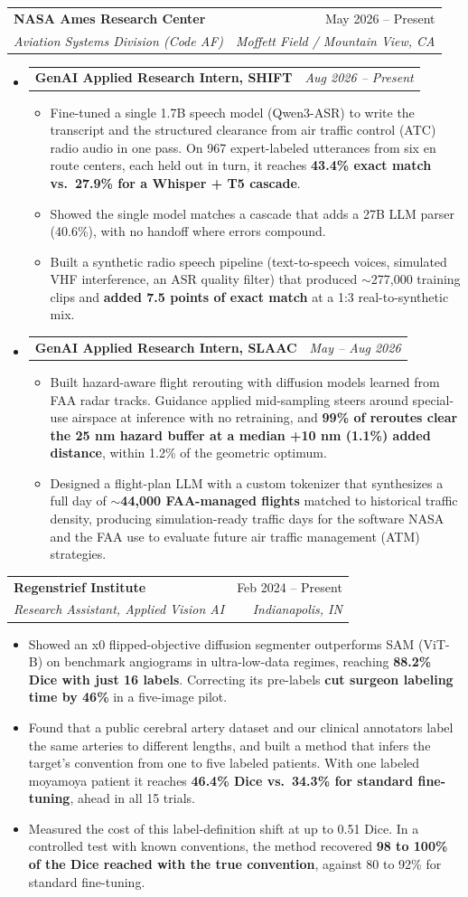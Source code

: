 \documentclass[letterpaper,10pt]{article}
\makeatletter
\newcommand{\resumeItem}[1]{
  \item\small{
    {#1 \vspace{-2pt}}
  }
}
\newcommand{\resumeSubheading}[4]{
  \vspace{1pt}\item
    \begin{tabular*}{0.97\textwidth}[t]{l@{\extracolsep{\fill}}r}
      \textbf{#1} & #2 \\
      \textit{\small#3} & \textit{\small #4} \\
    \end{tabular*}\vspace{-7pt}
}
\newcommand{\resumeSubSubheading}[2]{
    \vspace{4pt}\item
    \begin{tabular*}{\dimexpr0.97\textwidth-0.15in\relax}{l@{\extracolsep{\fill}}r}
      \textbf{\small#1} & \textit{\small #2} \\
    \end{tabular*}\vspace{-2pt}
}
\newcommand{\resumeSubHeadingListEnd}{\end{itemize}}
\newcommand{\resumeSubRoleListStart}{\begin{itemize}[leftmargin=0.15in, label={}, topsep=0pt, partopsep=0pt, itemsep=0pt, parsep=0pt]}
\newcommand{\resumeItemListStart}{\begin{itemize}[label=\textbullet, itemsep=3pt, parsep=0pt, topsep=4pt plus 0pt minus 0pt]}
\newcommand{\resumeItemListEnd}{\end{itemize}\vspace{-2pt}}
\makeatother
\begin{document}
    \resumeSubheading
      {NASA Ames Research Center}{May 2026 -- Present}
      {Aviation Systems Division (Code AF)}{Moffett Field / Mountain View, CA}
      \resumeSubRoleListStart
        \resumeSubSubheading{GenAI Applied Research Intern, SHIFT}{Aug 2026 -- Present}
        \resumeItemListStart
        \resumeItem{Fine-tuned a single 1.7B speech model (Qwen3-ASR) to write the transcript and the structured clearance from air traffic control (ATC) radio audio in one pass. On 967 expert-labeled utterances from six en route centers, each held out in turn, it reaches \textbf{43.4\% exact match vs.\ 27.9\% for a Whisper + T5 cascade}.}
        \resumeItem{Showed the single model matches a cascade that adds a 27B LLM parser (40.6\%), with no handoff where errors compound.}
        \resumeItem{Built a synthetic radio speech pipeline (text-to-speech voices, simulated VHF interference, an ASR quality filter) that produced $\sim$277,000 training clips and \textbf{added 7.5 points of exact match} at a 1:3 real-to-synthetic mix.}
        \resumeItemListEnd
        \vspace{4pt}
        \resumeSubSubheading{GenAI Applied Research Intern, SLAAC}{May -- Aug 2026}
        \resumeItemListStart
        \resumeItem{Built hazard-aware flight rerouting with diffusion models learned from FAA radar tracks. Guidance applied mid-sampling steers around special-use airspace at inference with no retraining, and \textbf{99\% of reroutes clear the 25 nm hazard buffer at a median +10 nm (1.1\%) added distance}, within 1.2\% of the geometric optimum.}
        \resumeItem{Designed a flight-plan LLM with a custom tokenizer that synthesizes a full day of \textbf{$\sim$44,000 FAA-managed flights} matched to historical traffic density, producing simulation-ready traffic days for the software NASA and the FAA use to evaluate future air traffic management (ATM) strategies.}
        \resumeItemListEnd
      \resumeSubHeadingListEnd

    \resumeSubheading
      {Regenstrief Institute}{Feb 2024 -- Present}
      {Research Assistant, Applied Vision AI}{Indianapolis, IN}
      \resumeItemListStart
        \resumeItem{Showed an x0 flipped-objective diffusion segmenter outperforms SAM (ViT-B) on benchmark angiograms in ultra-low-data regimes, reaching \textbf{88.2\% Dice with just 16 labels}. Correcting its pre-labels \textbf{cut surgeon labeling time by 46\%} in a five-image pilot.}
        \resumeItem{Found that a public cerebral artery dataset and our clinical annotators label the same arteries to different lengths, and built a method that infers the target's convention from one to five labeled patients. With one labeled moyamoya patient it reaches \textbf{46.4\% Dice vs.\ 34.3\% for standard fine-tuning}, ahead in all 15 trials.}
        \resumeItem{Measured the cost of this label-definition shift at up to 0.51 Dice. In a controlled test with known conventions, the method recovered \textbf{98 to 100\% of the Dice reached with the true convention}, against 80 to 92\% for standard fine-tuning.}
      \resumeItemListEnd
\end{document}
